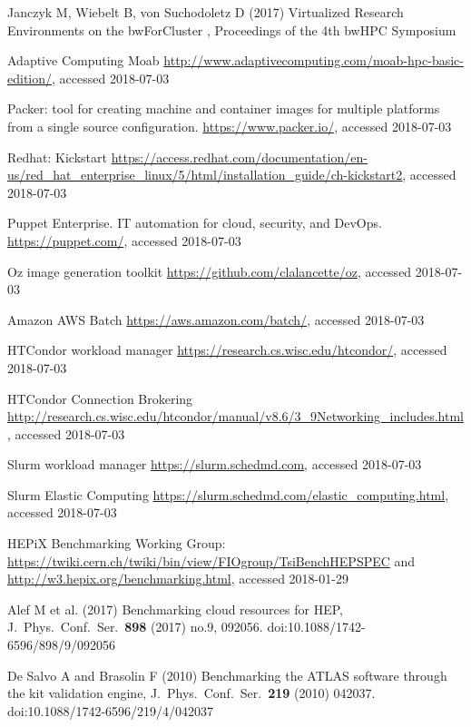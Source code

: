 \begin{thebibliography}{}
 Janczyk M,  Wiebelt B, von Suchodoletz D (2017)
  Virtualized Research Environments on the bwForCluster \NEMO,
  Proceedings of the 4th bwHPC Symposium 


Adaptive Computing Moab
\url{http://www.adaptivecomputing.com/moab-hpc-basic-edition/}, accessed 2018-07-03

Packer: tool for creating machine and container images for multiple platforms from a single source configuration. 
\url{https://www.packer.io/}, accessed 2018-07-03

 Redhat: Kickstart
\url{https://access.redhat.com/documentation/en-us/red_hat_enterprise_linux/5/html/installation_guide/ch-kickstart2}, accessed 2018-07-03

Puppet Enterprise. IT automation for cloud, security, and DevOps.
\url{https://puppet.com/}, accessed 2018-07-03


Oz image generation toolkit
\url{https://github.com/clalancette/oz}, accessed 2018-07-03

Amazon AWS Batch
\url{https://aws.amazon.com/batch/}, accessed 2018-07-03

HTCondor workload manager
\url{https://research.cs.wisc.edu/htcondor/}, accessed 2018-07-03

HTCondor Connection Brokering
\url{http://research.cs.wisc.edu/htcondor/manual/v8.6/3_9Networking_includes.html}, accessed 2018-07-03

  Slurm workload manager
  \url{https://slurm.schedmd.com}, accessed 2018-07-03
    
Slurm Elastic Computing
\url{https://slurm.schedmd.com/elastic_computing.html}, accessed 2018-07-03


 HEPiX Benchmarking Working Group:
\url{https://twiki.cern.ch/twiki/bin/view/FIOgroup/TsiBenchHEPSPEC}
and \url{http://w3.hepix.org/benchmarking.html}, accessed 2018-01-29



Alef M  et al. (2017) Benchmarking cloud resources for HEP,
J.\ Phys.\ Conf.\ Ser.\  {\bf 898} (2017) no.9,  092056.
doi:10.1088/1742-6596/898/9/092056


De Salvo A and Brasolin F (2010)
Benchmarking the ATLAS software through the kit validation engine,
J.\ Phys.\ Conf.\ Ser.\  {\bf 219} (2010) 042037.
doi:10.1088/1742-6596/219/4/042037



\end{thebibliography}
